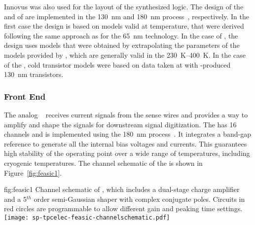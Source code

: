 Innovus was also used for the layout of the synthesized logic.
The design of the   and of 
are implemented in the  \SI{130}{nm} and \SI{180}{nm} 
 process~\cite{TSMC130,TSMC180}, respectively. In the
first case the design is based on  models valid at
\lntwo temperature, that were derived following the same approach
as for the \SI{65}{nm} technology. In the case of , 
the design uses models that were obtained by extrapolating the
parameters of the models provided by , which are 
generally valid in the \SIrange{230}{400}{K}. In the case of the 
, cold transistor models were based on data taken at  with
-produced \SI{130}{nm} transistors.

\subsubsection{Front End }
\label{sec:fdsp-tpcelec-design-femb-fe}

The analog  ~\cite{DeGeronimo:2011zz} receives 
current signals from the  sense wires and provides a way to 
amplify and shape the signals for downstream signal digitization. 
The   has \num{16} channels and is implemented 
using the  \SI{180}{nm}  process~\cite{TSMC180}. It 
integrates a band-gap reference to generate all the internal bias 
voltages and currents. This guarantees high stability of the operating 
point over a wide range of temperatures, including cryogenic temperatures. 
The channel schematic of the   is shown in 
Figure~\ref{fig:feasic1}. 

\begin{dunefigure}
{fig:feasic1}
{Channel schematic of  , which includes a 
dual-stage charge amplifier and a \num{5}$^{th}$ order semi-Gaussian 
shaper with complex conjugate poles. Circuits in red circles are 
programmable to allow different gain and peaking time settings.}
\texttt{[image: sp-tpcelec-feasic-channelschematic.pdf]}
\end{dunefigure}

